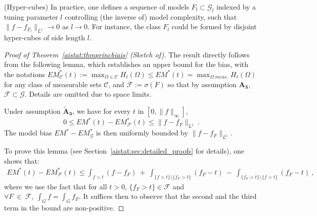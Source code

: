 \begin{remark}{\sc (Hyper-cubes)}
In practice, one defines a sequence of models $F_l\subset\mathcal{G}_l$ indexed by a tuning parameter $l$ controlling (the inverse of) model complexity, such that $\|f-f_{F_l}\|_{L^1} \rightarrow 0$ as $l \rightarrow 0$. %
For instance, the class $F_l$ could be formed by disjoint hyper-cubes of side length $l$.
\end{remark}

\begin{proof}[Proof of Theorem~\ref{aistat:thmprincbiais} (Sketch of)]
The result directly follows from the following lemma, which establishes an upper bound for the bias, with the notations $EM_{\mathcal{C}}^*(t):=\max_{\Omega \in \mathcal{C}}H_t(\Omega) \le EM^*(t)=\max_{\Omega\; meas.}H_t(\Omega)$ for any class of measurable sets $\mathcal{C}$, and $\mathcal{F}:= \sigma(F)$ so that by assumption $\mathbf{A_3}$, $\mathcal{F} \subset \mathcal{G}$. Details are omitted due to space limits.\\

\begin{lemma} 
\label{aistat:propbiais}
Under assumption $\mathbf{\tilde A_3}$,  we have for every $t$ in $[0,\|f\|_\infty]$, $$0\le EM^*(t)-EM^*_{\mathcal{F}}(t) \le \|f-f_{F}\|_{L^1}~. $$ The model bias $EM^*-EM^*_{\mathcal{G}}$ is then uniformly bounded by $\|f-f_{F}\|_{L^1}$.
\end{lemma}

To prove this lemma (see Section~\ref{aistat:sec:detailed_proofs} for details), one shows that:
\begin{align*}
EM^*(t)-EM^*_{\mathcal{F}}(t) \le \int_{f>t}(f-f_{F}) ~+~ \int_{\{f>t\}\setminus \{f_{F}>t\}}(f_{F}-t) ~-~\int_{\{f_{F}>t\} \setminus \{f>t\}}(f_{F}-t)~,
\end{align*}
where we use the fact that for all $t>0$, $\{ f_{F} > t \} \in \mathcal{F}$ and $\forall F~ \in~ \mathcal{F},~ \int_Gf=\int_Gf_{F}$.
It suffices then to observe that the second and the third term in the bound are non-positive.
\end{proof}


